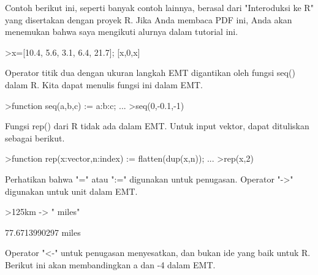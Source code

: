 \documentclass[12pt,Times new roman,letterpaper]{book}
\begin{document}
\begin{eulernootebook}
\begin{eulercomment}
\begin{eulercomment}
\begin{eulernootebook}
\begin{eulercomment}
\begin{eulercomment}
\begin{eulercomment}
\begin{eulercomment}
\begin{eulercomment}
\begin{eulercomment}
\begin{eulercomment}
\begin{eulercomment}
\begin{eulercomment}
\begin{eulercomment}
\begin{eulercomment}
\begin{eulercomment}
Contoh berikut ini, seperti banyak contoh lainnya, berasal dari
"Interoduksi ke R" yang disertakan dengan proyek R. Jika Anda membaca
PDF ini, Anda akan menemukan bahwa saya mengikuti alurnya dalam
tutorial ini.
\end{eulercomment}
\begin{eulerprompt}
>x=[10.4, 5.6, 3.1, 6.4, 21.7]; [x,0,x]
\end{eulerprompt}
\begin{euleroutput}
  [10.4,  5.6,  3.1,  6.4,  21.7,  0,  10.4,  5.6,  3.1,  6.4,  21.7]
\end{euleroutput}
\begin{eulercomment}
Operator titik dua dengan ukuran langkah EMT digantikan oleh fungsi
seq() dalam R. Kita dapat menulis fungsi ini dalam EMT.
\end{eulercomment}
\begin{eulerprompt}
>function seq(a,b,c) := a:b:c; ...
>seq(0,-0.1,-1)
\end{eulerprompt}
\begin{euleroutput}
  [0,  -0.1,  -0.2,  -0.3,  -0.4,  -0.5,  -0.6,  -0.7,  -0.8,  -0.9,  -1]
\end{euleroutput}
\begin{eulercomment}
Fungsi rep() dari R tidak ada dalam EMT. Untuk input vektor, dapat
dituliskan sebagai berikut.
\end{eulercomment}
\begin{eulerprompt}
>function rep(x:vector,n:index) := flatten(dup(x,n)); ...
>rep(x,2)
\end{eulerprompt}
\begin{euleroutput}
  [10.4,  5.6,  3.1,  6.4,  21.7,  10.4,  5.6,  3.1,  6.4,  21.7]
\end{euleroutput}
\begin{eulercomment}
Perhatikan bahwa "=" atau ":=" digunakan untuk penugasan. Operator
"-\textgreater{}" digunakan untuk unit dalam EMT.
\end{eulercomment}
\begin{eulerprompt}
>125km -> " miles"
\end{eulerprompt}
\begin{euleroutput}
  77.6713990297 miles
\end{euleroutput}
\begin{eulercomment}
Operator "\textless{}-" untuk penugasan menyesatkan, dan bukan ide yang baik
untuk R. Berikut ini akan membandingkan a dan -4 dalam EMT.
\end{eulercomment}
\begin{eulerprompt}

\end{eulerprompt}
\end{eulercomment}
\end{eulercomment}
\end{eulercomment}
\end{eulercomment}
\end{eulercomment}
\end{eulercomment}
\end{eulercomment}
\end{eulercomment}
\end{eulercomment}
\end{eulercomment}
\end{eulercomment}
\end{eulernootebook}
\end{eulercomment}
\end{eulercomment}
\end{eulernootebook}
\end{document}
